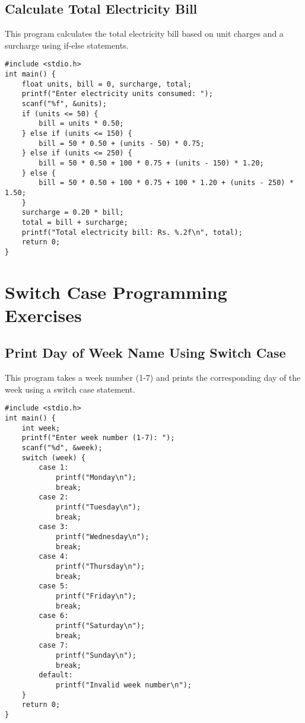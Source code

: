 \documentclass[a4paper,12pt]{article}
\begin{document}
\newpage

\subsection{Calculate Total Electricity Bill}
This program calculates the total electricity bill based on unit charges and a surcharge using if-else statements.

\begin{lstlisting}[caption={Calculate Total Electricity Bill}]
#include <stdio.h>
int main() {
    float units, bill = 0, surcharge, total;
    printf("Enter electricity units consumed: ");
    scanf("%f", &units);
    if (units <= 50) {
        bill = units * 0.50;
    } else if (units <= 150) {
        bill = 50 * 0.50 + (units - 50) * 0.75;
    } else if (units <= 250) {
        bill = 50 * 0.50 + 100 * 0.75 + (units - 150) * 1.20;
    } else {
        bill = 50 * 0.50 + 100 * 0.75 + 100 * 1.20 + (units - 250) * 1.50;
    }
    surcharge = 0.20 * bill;
    total = bill + surcharge;
    printf("Total electricity bill: Rs. %.2f\n", total);
    return 0;
}
\end{lstlisting}

\newpage

\section{Switch Case Programming Exercises}

\subsection{Print Day of Week Name Using Switch Case}
This program takes a week number (1-7) and prints the corresponding day of the week using a switch case statement.

\begin{lstlisting}[caption={Print Day of Week Name Using Switch Case}]
#include <stdio.h>
int main() {
    int week;
    printf("Enter week number (1-7): ");
    scanf("%d", &week);
    switch (week) {
        case 1:
            printf("Monday\n");
            break;
        case 2:
            printf("Tuesday\n");
            break;
        case 3:
            printf("Wednesday\n");
            break;
        case 4:
            printf("Thursday\n");
            break;
        case 5:
            printf("Friday\n");
            break;
        case 6:
            printf("Saturday\n");
            break;
        case 7:
            printf("Sunday\n");
            break;
        default:
            printf("Invalid week number\n");
    }
    return 0;
}
\end{lstlisting}
\end{document}
